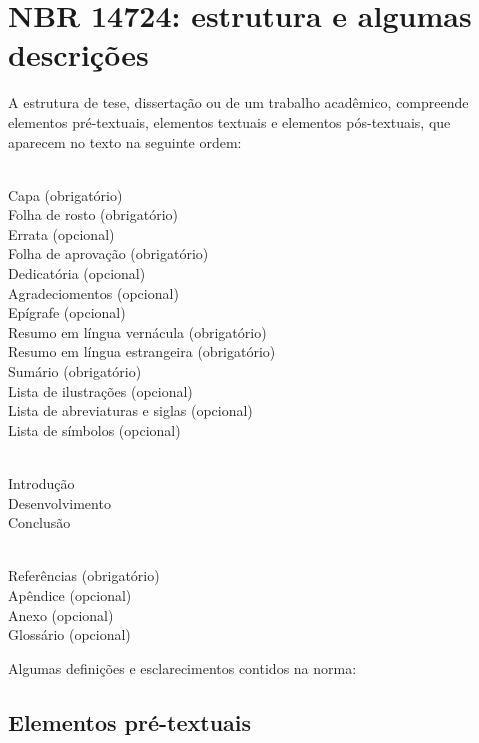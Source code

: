\documentclass[espaco=simples,appendix=Name]{abnt}
\newcommand{\descrtype}{descriptionbf}
\renewenvironment{description}%
  {\expandafter\csname\descrtype\endcsname\edef\enddescrtype{end\descrtype}}
  {\expandafter\csname\enddescrtype\endcsname}
\begin{document}
{
\smaller
\setlength{\parskip}{0cm}


\section{NBR 14724: estrutura e algumas descrições}
  \label{subsec: estrutura e algumas descricoes}

\cite[4]{NBR14724:2001} A estrutura de tese, dissertação ou de um
trabalho acadêmico, compreende elementos pré-textuais, elementos textuais e
elementos pós-textuais, que aparecem no texto na seguinte ordem:

\def\descrtype{descriptionit}
\begin{description} 
\item[Pré-textuais]\ \\
  Capa (obrigatório) \\
  Folha de rosto (obrigatório) \\
  Errata (opcional) \\
  Folha de aprovação (obrigatório) \\
  Dedicatória (opcional) \\
  Agradeciomentos (opcional) \\
  Epígrafe (opcional) \\
  Resumo em língua vernácula (obrigatório) \\
  Resumo em língua estrangeira (obrigatório) \\
  Sumário (obrigatório) \\
  Lista de ilustrações (opcional) \\
  Lista de abreviaturas e siglas (opcional) \\
  Lista de símbolos (opcional) 
\item[Textuais]\ \\
  Introdução \\
  Desenvolvimento \\
  Conclusão 
\item[Pós-textuais]\ \\
  Referências (obrigatório) \\
  Apêndice (opcional) \\
  Anexo (opcional) \\
  Glossário (opcional) 
\end{description}

Algumas definições e esclarecimentos contidos na norma:



\subsection{Elementos pré-textuais}\label{subsubsec: elementos pre-textuais}


}
\end{document}
